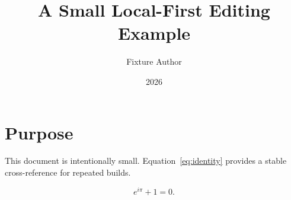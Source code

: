 \documentclass{article}
\title{A Small Local-First Editing Example}
\author{Fixture Author}
\date{2026}
\begin{document}
\maketitle

\section{Purpose}
This document is intentionally small. Equation~\ref{eq:identity} provides a
stable cross-reference for repeated builds.

\begin{equation}
  e^{i\pi} + 1 = 0.
  \label{eq:identity}
\end{equation}
\end{document}
